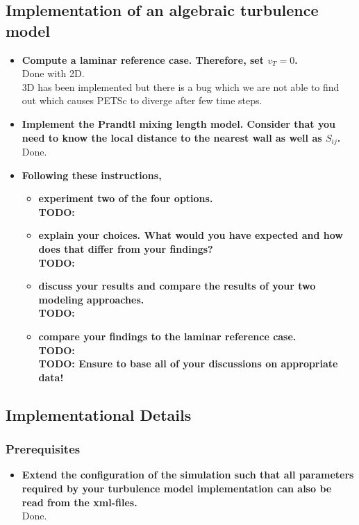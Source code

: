 \documentclass[a4paper]{article}
\newcommand{\td}[1]{
	\textbf{\color{red}TODO: {#1}}
}
\begin{document}
\subsection{Implementation of an algebraic turbulence model}
\begin{itemize}
	\item \textbf{Compute a laminar reference case. Therefore, set $v_T = 0$.}\\
	Done with 2D.\\
	3D has been implemented but there is a bug which we are not able to find out which causes PETSc to diverge after few time steps.
	\item \textbf{Implement the Prandtl mixing length model. Consider that you need to know the local distance to the nearest wall as well as $S_{ij}$.}\\
	Done.
	\item \textbf{Following these instructions,}
	\begin{itemize}
		\item \textbf{experiment two of the four options.}\\
		\td{}
		\item \textbf{explain your choices. What would you have expected and how does that differ from your findings?}\\
		\td{}
		\item \textbf{discuss your results and compare the results of your two modeling approaches.}\\
		\td{}
		\item \textbf{compare your findings to the laminar reference case.}\\
		\td{}\\
		\td{Ensure to base all of your discussions on appropriate data!}
	\end{itemize}
\end{itemize}
\subsection{Implementational Details}
\subsubsection{Prerequisites}
	\begin{itemize}
	\item \textbf{Extend the configuration of the simulation such that all parameters required by your turbulence model implementation can also be read from the xml-files.}\\
	Done.
\end{itemize}
\end{document}
